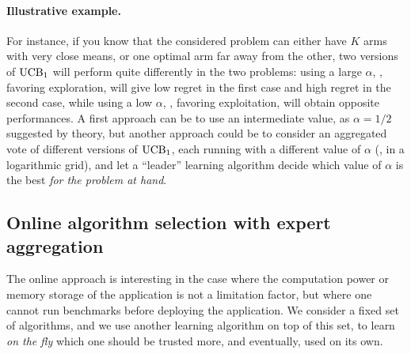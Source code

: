 \paragraph{Illustrative example.}
%
For instance, if you know that the considered problem can either have $K$ arms with very close means, or one optimal arm far away from the other, two versions of $\mathrm{UCB}_1$ will perform quite differently in the two problems:
using a large $\alpha$, \ie, favoring exploration, will give low regret in the first case and high regret in the second case,
while using a low $\alpha$, \ie, favoring exploitation, will obtain opposite performances.
A first approach can be to use an intermediate value, as $\alpha=1/2$ suggested by theory, but another approach could be to consider an aggregated vote of different versions of $\mathrm{UCB}_1$, each running with a different value of $\alpha$ (\eg, in a logarithmic grid), and let a ``leader'' learning algorithm decide which value of $\alpha$ is the best \emph{for the problem at hand}.






\subsection{Online algorithm selection with expert aggregation}

The online approach is interesting in the case where the computation power or memory storage of the application is not a limitation factor, but where one cannot run benchmarks before deploying the application.
We consider a fixed set of algorithms, and we use another learning algorithm on top of this set, to learn \emph{on the fly} which one should be trusted more, and eventually, used on its own.

